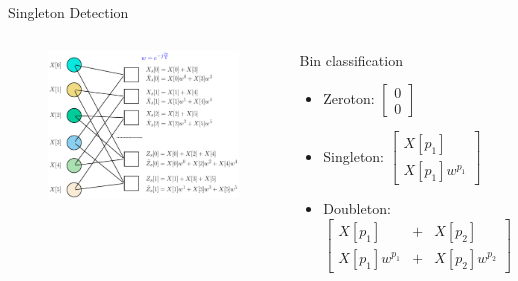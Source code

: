 \documentclass[10pt,xcolor=table]{beamer}
\begin{document}
	\begin{frame}{Singleton Detection}
			
		
			\vspace{-5pt}
			\begin{columns}
				\begin{figure}[t]
					
					\includegraphics[width=2.7in]{Factorgraph_example_tilde}
				\end{figure}
				\begin{block}{Bin classification}
					\begin{itemize}
						\item \alert{Zeroton}: 
						\vspace{3pt}
						$\begin{bmatrix}
							0 \\
							0 
						\end{bmatrix}$
						\item \alert{Singleton:}
						\vspace{3pt}
						$
						\begin{bmatrix}
						X[p_1] \\
						X[p_1]w^{p_1}
						\end{bmatrix}$
						
						\item \alert{Doubleton:}\\
						\vspace{7pt}
						$
						\begin{bmatrix}
						X[p_1] &+ &X[p_2] \\
						X[p_1]w^{p_1} &+ &X[p_2]w^{p_2}
						\end{bmatrix}$
					\end{itemize}
				\end{block}
				

\end{columns}
\end{frame}
\end{document}
